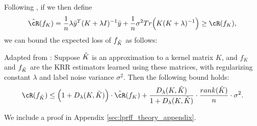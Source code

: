 
Following \citet{avron17}, if we then define 
$$\hcR(f_K) = \frac{1}{n}\lambda \by^T(K+\lambda I)^{-1}\by + \frac{1}{n}\sigma^2 Tr\Big(K(K+\lambda)^{-1}\Big) \geq \cR(f_K),$$ 
we can bound the expected loss of $f_{\tilde{K}}$ as follows:

\begin{proposition}{Adapted from \citep{avron17}:}
Suppose $\tilde{K}$ is an approximation to a kernel matrix $K$, and $f_{K}$ and $f_{\tilde{K}}$ are the KRR estimators learned using these matrices, with regularizing constant $\lambda$ and label noise variance $\sigma^2$. Then the following bound holds:
\begin{eqnarray}
\cR(f_{\tK}) \leq \Big(1+D_{\lambda}(K,\tK)\Big)\cdot \hcR(f_K) + \frac{D_{\lambda}(K,\tK)}{1+D_{\lambda}(K,\tK)}\cdot \frac{rank(\tK)}{n}\cdot\sigma^2.
\end{eqnarray}
\end{proposition}
We include a proof in Appendix \ref{sec:lprff_theory_appendix}. 

